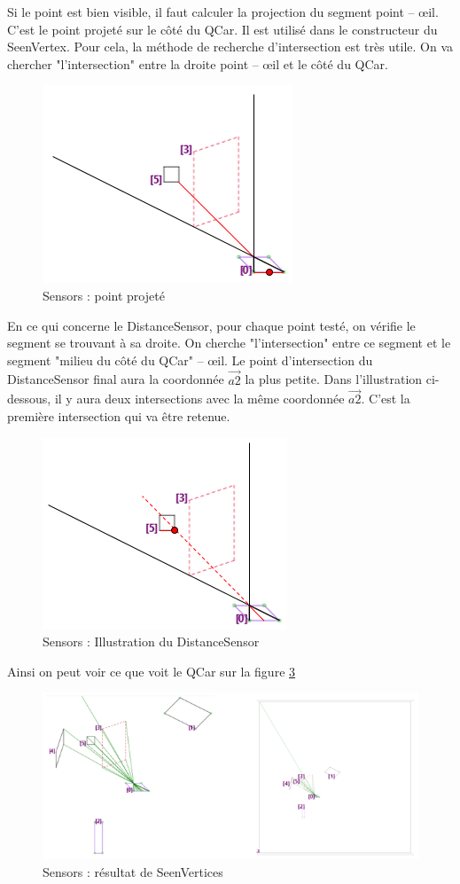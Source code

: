 \documentclass[a4paper, 12pt]{article}
\begin{document}
Si le point est bien visible, il faut calculer la projection du segment point – œil. C'est le point projeté sur le côté  du QCar. Il est utilisé dans le constructeur du SeenVertex. Pour cela, la méthode de recherche d'intersection est très utile. On va chercher "l'intersection" entre la droite point – œil et le côté  du QCar.
\begin{figure}[H]
\centering
\includegraphics[width=0.5\linewidth]{includes/images/sensors/5_projectedPoint}
\caption{Sensors : point projeté}
\label{fig:5projectedpoint}
\end{figure}
En ce qui concerne le DistanceSensor, pour chaque point testé, on vérifie le segment se trouvant à sa droite. On cherche "l'intersection" entre ce segment et le segment "milieu du côté  du QCar" – œil. Le point d'intersection du DistanceSensor final aura la coordonnée $\vec{a2}$ la plus petite. Dans l'illustration ci-dessous, il y aura deux intersections avec la même coordonnée $\vec{a2}$. C'est la première intersection qui va être retenue.
\begin{figure}[H]
\centering
\includegraphics[width=0.5\linewidth]{includes/images/sensors/6_distanceSensor}
\caption{Sensors : Illustration du DistanceSensor}
\label{fig:6distancesensor}
\end{figure}
Ainsi on peut voir ce que voit le QCar sur la figure \ref{fig:7seenvertices}
\begin{figure}[H]
\centering
\includegraphics[width=\linewidth]{includes/images/sensors/7_seenVertices}
\caption{Sensors : résultat de SeenVertices}
\label{fig:7seenvertices}
\end{figure}
\end{document}
